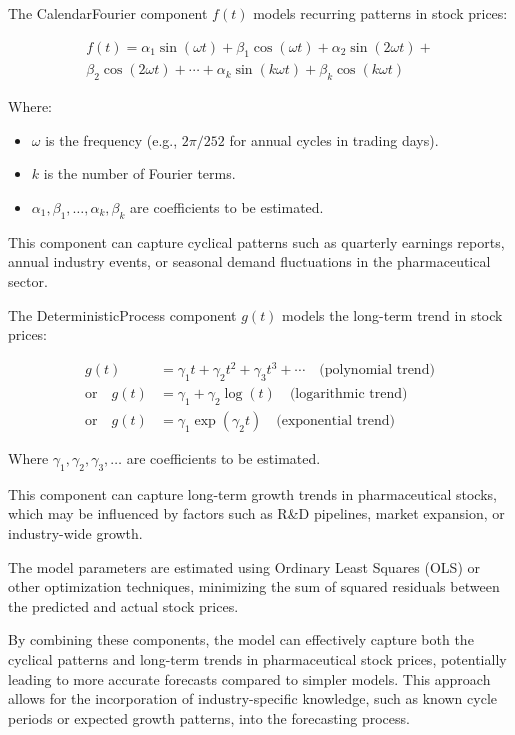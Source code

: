 \documentclass{ieeeojies}
\begin{document}
The CalendarFourier component $f(t)$ models recurring patterns in stock prices:

\begin{equation}
  \begin{split}
  f(t) = \alpha_1\sin(\omega t) + \beta_1\cos(\omega t) + \alpha_2\sin(2\omega t) +  \\
  \beta_2\cos(2\omega t) + \cdots + \alpha_k\sin(k\omega t) + \beta_k\cos(k\omega t)
  \end{split}
  \end{equation}

Where:
\begin{itemize}
    \item $\omega$ is the frequency (e.g., $2\pi/252$ for annual cycles in trading days).
    \item $k$ is the number of Fourier terms.
    \item $\alpha_1, \beta_1, \ldots, \alpha_k, \beta_k$ are coefficients to be estimated.
\end{itemize}

This component can capture cyclical patterns such as quarterly earnings reports, annual industry events, or seasonal demand fluctuations in the pharmaceutical sector.

The DeterministicProcess component $g(t)$ models the long-term trend in stock prices:

\begin{align}
g(t) &= \gamma_1t + \gamma_2t^2 + \gamma_3t^3 + \cdots \quad \text{(polynomial trend)} \\
\text{or} \quad g(t) &= \gamma_1 + \gamma_2\log(t) \quad \text{(logarithmic trend)} \\
\text{or} \quad g(t) &= \gamma_1\exp(\gamma_2t) \quad \text{(exponential trend)}
\end{align}

Where $\gamma_1, \gamma_2, \gamma_3, \ldots$ are coefficients to be estimated.

This component can capture long-term growth trends in pharmaceutical stocks, which may be influenced by factors such as R\&D pipelines, market expansion, or industry-wide growth.

The model parameters are estimated using Ordinary Least Squares (OLS) or other optimization techniques, minimizing the sum of squared residuals between the predicted and actual stock prices.

By combining these components, the model can effectively capture both the cyclical patterns and long-term trends in pharmaceutical stock prices, potentially leading to more accurate forecasts compared to simpler models. This approach allows for the incorporation of industry-specific knowledge, such as known cycle periods or expected growth patterns, into the forecasting process.
\end{document}
